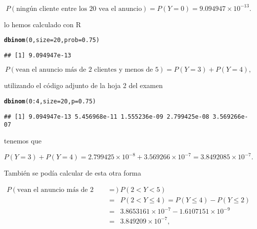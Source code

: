 \documentclass[12pt]{article}\usepackage[]{graphicx}\usepackage[]{color}
\makeatletter
\newcommand{\hlnum}[1]{\textcolor[rgb]{0.686,0.059,0.569}{#1}}%
\newcommand{\hlopt}[1]{\textcolor[rgb]{0,0,0}{#1}}%
\newcommand{\hlstd}[1]{\textcolor[rgb]{0.345,0.345,0.345}{#1}}%
\newcommand{\hlkwc}[1]{\textcolor[rgb]{0.333,0.667,0.333}{#1}}%
\newcommand{\hlkwd}[1]{\textcolor[rgb]{0.737,0.353,0.396}{\textbf{#1}}}%
\newenvironment{kframe}{%
 \def\at@end@of@kframe{}%
 \ifinner\ifhmode%
  \def\at@end@of@kframe{\end{minipage}}%
  \begin{minipage}{\columnwidth}%
 \fi\fi%
 \def\FrameCommand##1{\hskip\@totalleftmargin \hskip-\fboxsep
 \colorbox{shadecolor}{##1}\hskip-\fboxsep
     \hskip-\linewidth \hskip-\@totalleftmargin \hskip\columnwidth}%
 \MakeFramed {\advance\hsize-\width
   \@totalleftmargin\z@ \linewidth\hsize
   \@setminipage}}%
 {\par\unskip\endMakeFramed%
 \at@end@of@kframe}
\newenvironment{knitrout}{}{} %
\renewcommand{\leq}{\leqslant}
\makeatother
\begin{document}
$$P(\mbox{ningún cliente entre los 20 vea el anuncio})=P(Y=0)=\ensuremath{9.094947\times 10^{-13}}.$$

lo hemos calculado con R

\begin{knitrout}
\color{fgcolor}\begin{kframe}
\begin{alltt}
\hlkwd{dbinom}\hlstd{(}\hlnum{0}\hlstd{,}\hlkwc{size}\hlstd{=}\hlnum{20}\hlstd{,}\hlkwc{prob}\hlstd{=}\hlnum{0.75}\hlstd{)}
\end{alltt}
\begin{verbatim}
## [1] 9.094947e-13
\end{verbatim}
\end{kframe}
\end{knitrout}

$$P(\mbox{vean el anuncio  más de 2 clientes  y menos de 5})=P(Y=3)+P(Y=4),$$

utilizando el código adjunto de la hoja 2 del examen
\begin{knitrout}
\color{fgcolor}\begin{kframe}
\begin{alltt}
\hlkwd{dbinom}\hlstd{(}\hlnum{0}\hlopt{:}\hlnum{4}\hlstd{,}\hlkwc{size}\hlstd{=}\hlnum{20}\hlstd{,}\hlkwc{p}\hlstd{=}\hlnum{0.75}\hlstd{)}
\end{alltt}
\begin{verbatim}
## [1] 9.094947e-13 5.456968e-11 1.555236e-09 2.799425e-08 3.569266e-07
\end{verbatim}
\end{kframe}
\end{knitrout}

tenemos que 


$$
P(Y=3)+P(Y=4)=2.799425\times 10^{-8}+ 3.569266\times 10^{-7}=
\ensuremath{3.8492085\times 10^{-7}}.
$$


También se podía calcular  de esta otra forma

\begin{eqnarray*}
P(\mbox{vean el anuncio más de 2 clientes y menos de 5})&=& P(2<Y<5)
\\ &=&
P(2<Y\leq 4)= P(Y\leq 4)-P(Y\leq 2)\\
&=& \ensuremath{3.8653161\times 10^{-7}}- \ensuremath{1.6107151\times 10^{-9}}
\\ 
&=&
\ensuremath{3.849209\times 10^{-7}},
\end{eqnarray*}
\end{document}
